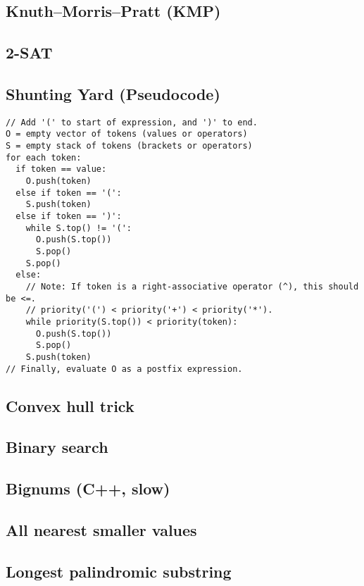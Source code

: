 \documentclass[9pt]{extarticle}
\begin{document}
\begin{multicols*}{3}
\subsection{Knuth--Morris--Pratt (KMP)} %


\subsection{2-SAT} %


\subsection{Shunting Yard (Pseudocode)} %
\begin{lstlisting}
// Add '(' to start of expression, and ')' to end.
O = empty vector of tokens (values or operators)
S = empty stack of tokens (brackets or operators)
for each token:
  if token == value:
    O.push(token)
  else if token == '(':
    S.push(token)
  else if token == ')':
    while S.top() != '(':
      O.push(S.top())
      S.pop()
    S.pop()
  else:
    // Note: If token is a right-associative operator (^), this should be <=.
	// priority('(') < priority('+') < priority('*').
    while priority(S.top()) < priority(token):
      O.push(S.top())
      S.pop()
    S.push(token)
// Finally, evaluate O as a postfix expression.
\end{lstlisting}

\subsection{Convex hull trick} %


\subsection{Binary search} %


\subsection{Bignums (C++, slow)} %


\subsection{All nearest smaller values} %


\subsection{Longest palindromic substring} %

\end{multicols*}
\end{document}
